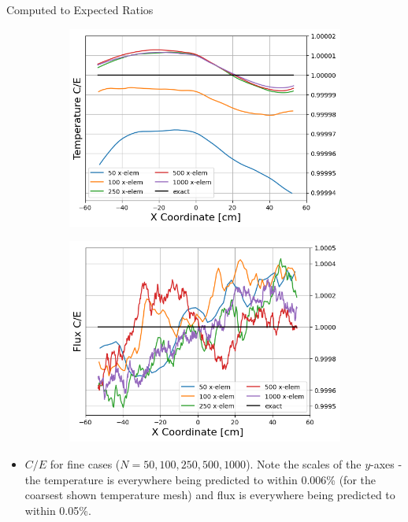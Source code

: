 \documentclass[9pt,t]{beamer}
\begin{document}
\begin{frame}{Computed to Expected Ratios}
    \begin{figure}[T]
        \begin{subfigure}{0.475\linewidth}
            \includegraphics[height=0.8\linewidth]{figures/fine_temp_num_to_analy_ratios.png}
        \end{subfigure}\hspace{0.4cm}
        \begin{subfigure}{0.475\linewidth}
            \includegraphics[height=0.8\linewidth]{figures/fine_flux_num_to_analy_ratios.png}
        \end{subfigure}
    \end{figure}
    \begin{itemize}
        \item $C/E$ for fine cases ($N=50,100,250,500,1000$). Note the scales of the $y$-axes - the temperature is everywhere being predicted to within 0.006\% (for the coarsest shown temperature mesh) and flux is everywhere being predicted to within 0.05\%.
    \end{itemize}
\end{frame}
\end{document}
